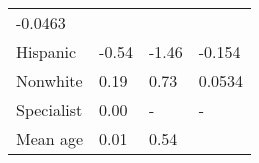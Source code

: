 \documentclass[
]{book}
\begin{document}
\begin{longtable}[]{@{}llll@{}}
\begin{minipage}[t]{0.21\columnwidth}
-0.0463\strut
\end{minipage}\tabularnewline
\begin{minipage}[t]{0.17\columnwidth}\raggedright
Hispanic\strut
\end{minipage} & \begin{minipage}[t]{0.25\columnwidth}\raggedright
-0.54\strut
\end{minipage} & \begin{minipage}[t]{0.25\columnwidth}\raggedright
-1.46\strut
\end{minipage} & \begin{minipage}[t]{0.21\columnwidth}\raggedright
-0.154\strut
\end{minipage}\tabularnewline
\begin{minipage}[t]{0.17\columnwidth}\raggedright
Nonwhite\strut
\end{minipage} & \begin{minipage}[t]{0.25\columnwidth}\raggedright
0.19\strut
\end{minipage} & \begin{minipage}[t]{0.25\columnwidth}\raggedright
0.73\strut
\end{minipage} & \begin{minipage}[t]{0.21\columnwidth}\raggedright
0.0534\strut
\end{minipage}\tabularnewline
\begin{minipage}[t]{0.17\columnwidth}\raggedright
Specialist\strut
\end{minipage} & \begin{minipage}[t]{0.25\columnwidth}\raggedright
0.00\strut
\end{minipage} & \begin{minipage}[t]{0.25\columnwidth}\raggedright
-\strut
\end{minipage} & \begin{minipage}[t]{0.21\columnwidth}\raggedright
-\strut
\end{minipage}\tabularnewline
\begin{minipage}[t]{0.17\columnwidth}\raggedright
Mean age\strut
\end{minipage} & \begin{minipage}[t]{0.25\columnwidth}\raggedright
0.01\strut
\end{minipage} & \begin{minipage}[t]{0.25\columnwidth}\raggedright
0.54\strut
\end{minipage} & \begin{minipage}[t]{0.21\columnwidth}\raggedright

\end{minipage}
\end{longtable}
\end{document}
